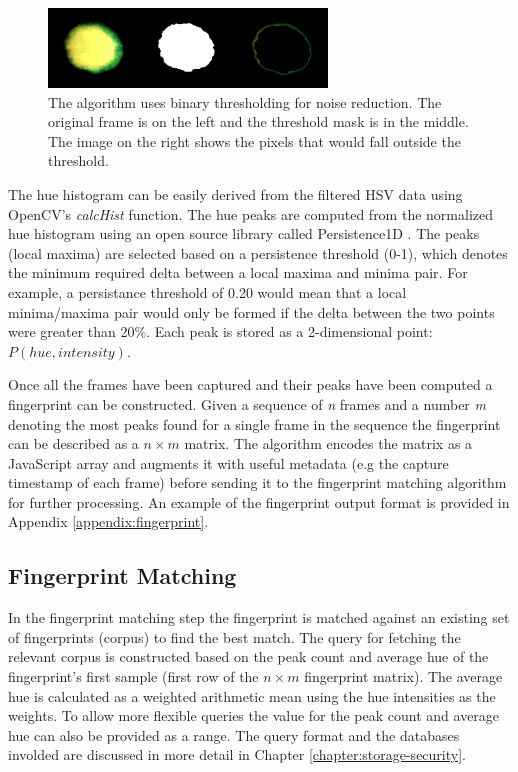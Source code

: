 \documentclass[thesis.tex]{subfiles}
\begin{document}
\begin{figure}[h]
\centering \includegraphics[width=\textwidth,height=\textheight,keepaspectratio=true]{images/design_implementation/binary_thresholding}
\caption{The algorithm uses binary thresholding for noise reduction. The original frame is on the left and the threshold mask is in the middle. The image on the right shows the pixels that would fall outside the threshold.\label{figure:binary-thresholding}}
\end{figure}

The hue histogram can be easily derived from the filtered HSV data using OpenCV's \emph{calcHist} function. The hue peaks are computed from the normalized hue histogram using an open source library called Persistence1D \cite{persistence1d}. The peaks (local maxima) are selected based on a persistence threshold (0-1), which denotes the minimum required delta between a local maxima and minima pair. For example, a persistance threshold of 0.20 would mean that a local minima/maxima pair would only be formed if the delta between the two points were greater than 20\%. Each peak is stored as a 2-dimensional point: $P(hue, intensity)$.

Once all the frames have been captured and their peaks have been computed a fingerprint can be constructed. Given a sequence of \emph{n} frames and a number \emph{m} denoting the most peaks found for a single frame in the sequence the fingerprint can be described as a $n \times m$ matrix. The algorithm encodes the matrix as a JavaScript array and augments it with useful metadata (e.g the capture timestamp of each frame) before sending it to the fingerprint matching algorithm for further processing. An example of the fingerprint output format is provided in Appendix \ref{appendix:fingerprint}.

\subsection{Fingerprint Matching}
\label{chapter:fingerprint-matching}

In the fingerprint matching step the fingerprint is matched against an existing set of fingerprints (corpus) to find the best match. The query for fetching the relevant corpus is constructed based on the peak count and average hue of the fingerprint's first sample (first row of the $n \times m$ fingerprint matrix). The average hue is calculated as a weighted arithmetic mean using the hue intensities as the weights. To allow more flexible queries the value for the peak count and average hue can also be provided as a range. The query format and the databases involded are discussed in more detail in Chapter \ref{chapter:storage-security}.
\end{document}
